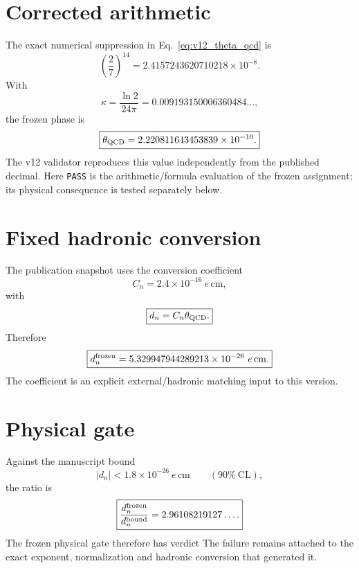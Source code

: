 \section{Corrected arithmetic}

The exact numerical suppression in Eq.~\eqref{eq:v12_theta_qcd} is
\begin{equation}
\left(\frac27\right)^{14}
=2.4157243620710218\times10^{-8}.
\end{equation}
With
\[
\kappa=\frac{\ln2}{24\pi}=0.009193150006360484\ldots,
\]
the frozen phase is
\begin{equation}
\boxed{
\theta_{\rm QCD}
=2.220811643453839\times10^{-10}.
}
\label{eq:v12_theta_qcd_numeric}
\end{equation}
The v12 validator reproduces this value independently from the published decimal.
Here \texttt{PASS} is the arithmetic/formula evaluation of the frozen assignment; its physical consequence is tested separately below.

\section{Fixed hadronic conversion}

The publication snapshot uses the conversion coefficient
\begin{equation}
C_n=2.4\times10^{-16}\ e\,\mathrm{cm},
\end{equation}
with
\begin{equation}
\boxed{
d_n=C_n\theta_{\rm QCD}.
}
\label{eq:v12_nedm_map}
\end{equation}
Therefore
\begin{equation}
\boxed{
d_n^{\rm frozen}
=5.329947944289213\times10^{-26}\ e\,\mathrm{cm}.
}
\label{eq:v12_nedm_value}
\end{equation}
The coefficient is an explicit external/hadronic matching input to this version.

\section{Physical gate}

Against the manuscript bound
\begin{equation}
|d_n|<1.8\times10^{-26}\ e\,\mathrm{cm}
\qquad(90\%\ \mathrm{CL}),
\label{eq:v12_nedm_bound}
\end{equation}
the ratio is
\begin{equation}
\boxed{
\frac{d_n^{\rm frozen}}{d_n^{\rm bound}}
=2.96108219127\ldots .
}
\end{equation}
The frozen physical gate therefore has verdict
The failure remains attached to the exact exponent, normalization and hadronic conversion that generated it.

